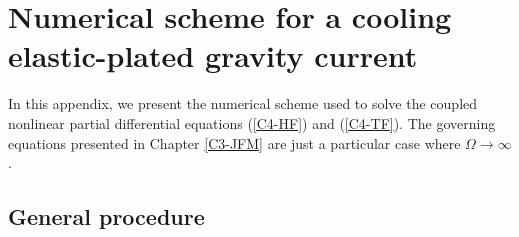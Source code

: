 \chapter{Numerical  scheme   for  a  cooling   elastic-plated  gravity
  current}
\label{chap:A1}

In this  appendix, we present the  numerical scheme used to  solve the
coupled  nonlinear partial  differential  equations (\ref{C4-HF})  and
(\ref{C4-TF}).    The  governing   equations   presented  in   Chapter
\ref{C3-JFM}     are     just      a     particular     case     where
$\Omega \rightarrow \infty$.

\section{General procedure}
\label{C3-sec:general-procedure}

